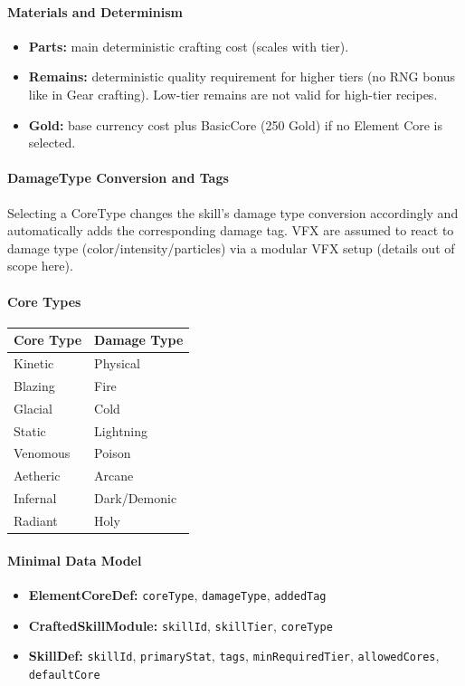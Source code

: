 \paragraph{Materials and Determinism}
\begin{itemize}
	\item \textbf{Parts:} main deterministic crafting cost (scales with tier).
	\item \textbf{Remains:} deterministic quality requirement for higher tiers (no RNG bonus like in Gear crafting).
	Low-tier remains are not valid for high-tier recipes.
	\item \textbf{Gold:} base currency cost plus BasicCore (250 Gold) if no Element Core is selected.
\end{itemize}

\paragraph{DamageType Conversion and Tags}
Selecting a CoreType changes the skill's damage type conversion accordingly and automatically adds the corresponding damage tag.
VFX are assumed to react to damage type (color/intensity/particles) via a modular VFX setup (details out of scope here).

\paragraph{Core Types}
\begin{tabular}{l l}
	\textbf{Core Type} & \textbf{Damage Type} \\
	\hline
	Kinetic  & Physical      \\
	Blazing  & Fire          \\
	Glacial  & Cold          \\
	Static   & Lightning     \\
	Venomous & Poison        \\
	Aetheric & Arcane        \\
	Infernal & Dark/Demonic  \\
	Radiant  & Holy          \\
	\hline
\end{tabular}

\paragraph{Minimal Data Model}
\begin{itemize}
	\item \textbf{ElementCoreDef:} \texttt{coreType}, \texttt{damageType}, \texttt{addedTag}
	\item \textbf{CraftedSkillModule:} \texttt{skillId}, \texttt{skillTier}, \texttt{coreType}
	\item \textbf{SkillDef:} \texttt{skillId}, \texttt{primaryStat}, \texttt{tags}, \texttt{minRequiredTier}, \texttt{allowedCores}, \texttt{defaultCore}
\end{itemize}

